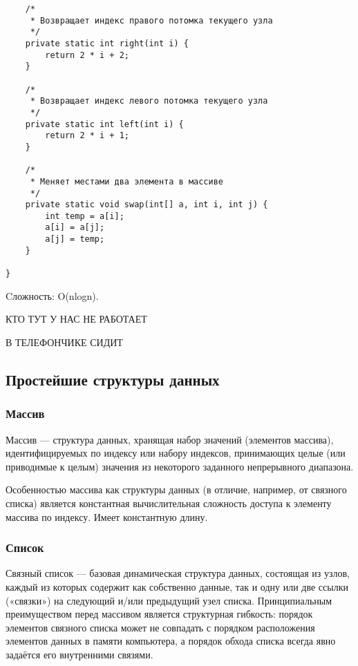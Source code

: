 \documentclass[12pt]{matmex-diploma}
\begin{document}
\begin{verbatim}
    /*
     * Возвращает индекс правого потомка текущего узла
     */
    private static int right(int i) {
        return 2 * i + 2;
    }
    
    /*
     * Возвращает индекс левого потомка текущего узла
     */
    private static int left(int i) {
        return 2 * i + 1;
    }
    
    /*
     * Меняет местами два элемента в массиве
     */
    private static void swap(int[] a, int i, int j) {
        int temp = a[i];
        a[i] = a[j];
        a[j] = temp;
    }

}
            \end{verbatim}
            
            Cложность: O(nlogn).
            
            КТО ТУТ У НАС НЕ РАБОТАЕТ
            
            В ТЕЛЕФОНЧИКЕ СИДИТ
            
    \subsection{Простейшие структуры данных}
    
        \subsubsection*{Массив}
            Массив — структура данных, хранящая набор значений (элементов массива), идентифицируемых по индексу или набору индексов, принимающих целые (или приводимые к целым) значения из некоторого заданного непрерывного диапазона. 
            
            Особенностью массива как структуры данных (в отличие, например, от связного списка) является константная вычислительная сложность доступа к элементу массива по индексу. Имеет константную длину.
            
        \subsubsection*{Список}
            Связный список — базовая динамическая структура данных, состоящая из узлов, каждый из которых содержит как собственно данные, так и одну или две ссылки («связки») на следующий и/или предыдущий узел списка. Принципиальным преимуществом перед массивом является структурная гибкость: порядок элементов связного списка может не совпадать с порядком расположения элементов данных в памяти компьютера, а порядок обхода списка всегда явно задаётся его внутренними связями.
            
\end{document}
